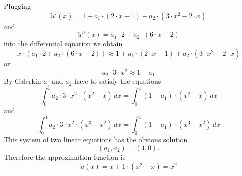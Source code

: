 \begin{loesung}
\begin{teilaufgaben}
\item
Plugging
\[
\tilde u'(x)
=
1 + a_1 \cdot (2 \cdot x - 1) + a_2 \cdot (3 \cdot x^2 - 2 \cdot x)
\]
and
\[
\tilde u''(x) = a_1 \cdot 2 + a_2 \cdot (6 \cdot x - 2)
\]
into the differential equation we obtain
\[
x \cdot (a_1 \cdot 2 + a_2 \cdot (6 \cdot x - 2)) \approx 1
+
a_1 \cdot (2 \cdot x - 1) + a_2 \cdot (3 \cdot x^2 - 2 \cdot x)
\]
or
\begin{equation}
a_2 \cdot 3 \cdot x^2 \approx 1 - a_1
\tag{\bf 1P}
\end{equation}
By Galerkin $a_1$ and $a_2$ have to satisfy the equations
\[
\int_{0}^1 a_2 \cdot 3 \cdot x^2 \cdot (x^2 - x) \,dx
=
\int_0^1 (1 - a_1) \cdot (x^2-x) \,dx
\]
and
\begin{equation}
\int_{0}^1 a_2 \cdot 3 \cdot x^2 \cdot (x^3 - x^2) \,dx
=
\int_0^1 (1 - a_1) \cdot (x^3-x^2) \,dx
\tag{\bf 1P}
\end{equation}
This system of two linear equations has the obvious solution
\[
(a_1, a_2) = (1,0).
\]
Therefore the approximation function is
\begin{equation}
\tilde u(x) = x + 1 \cdot (x^2 - x) = x^2
\tag{\bf 1P}
\end{equation}
\end{teilaufgaben}
\end{loesung}

